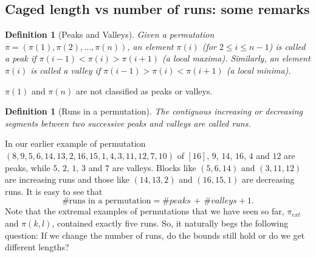 \documentclass[11pt, a4paper]{article}
\theoremstyle{compact}
\newtheorem{definition}[theorem]{Definition}
\begin{document}
\subsection{Caged length vs number of runs: some remarks}
\begin{definition}[Peaks and Valleys]
    Given a permutation $\pi=(\pi(1), \pi(2), \dots, \pi(n))$, an element $\pi(i)$ (for $2\le i\le n-1$) is called a peak if $\pi(i-1)<\pi(i)>\pi(i+1) $ (a local maxima). Similarly, an element $\pi(i)$ is called a valley if $\pi(i-1)>\pi(i)<\pi(i+1) $ (a local minima).  
\end{definition}
$\pi(1)$ and $\pi(n)$ are not classified as peaks or valleys. 
\begin{definition}[Runs in a permutation]
    The contiguous increasing or decreasing segments between two successive peaks and valleys are called runs.
\end{definition}
In our earlier example of permutation $(8,9,5,6,14,13,2,16,15,1,4,3,11,12,7,10)$ of $[16]$, $9, \, 14, \, 16, \, 4$ and $ 12  $ are peaks, while $5, \, 2, \, 1, \, 3 $ and $7$ are valleys. Blocks like $(5, 6, 14)$ and $(3, 11, 12)$ are increasing runs and those like $(14, 13, 2)$ and $(16, 15, 1)$ are decreasing runs. It is easy to see that 
\[
\#\text{runs in a permutation} = \#peaks \, + \, \#valleys + 1.
\]
Note that the extremal examples of permutations that we have seen so far, $\pi_{ext}$ and $\pi(k,l)$, contained exactly five runs. So, it naturally begs the following question: If we change the number of runs, do the bounds still hold or do we get different lengths? \\
\end{document}
